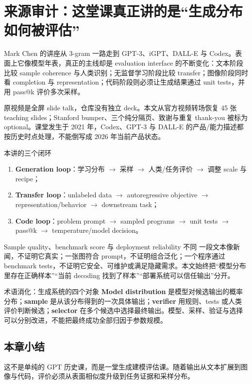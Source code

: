 \section{来源审计：这堂课真正讲的是“生成分布如何被评估”}

Mark Chen 的讲座从 3-gram 一路走到 GPT-3、iGPT、DALL-E 与 Codex。表面上它像模型年表，真正的主线却是 evaluation interface 的不断变化：文本阶段比较 sample coherence 与人类识别；无监督学习阶段比较 transfer；图像阶段同时看 completion 与 representation；代码阶段则必须让生成结果通过 unit tests，并用 pass@k 评价多次采样。

原视频是全屏 slide talk，仓库没有独立 deck。本文从官方视频转场恢复 45 张 teaching slides；Stanford bumper、三个纯分隔页、致谢与重复 thank-you 被标为 optional。课堂发生于 2021 年，Codex、GPT-3 与 DALL-E 的产品/能力描述都按历史时点处理，不能倒写成 2026 年当前产品状态。

\begin{importantbox}{本讲的三个闭环}
\begin{enumerate}
  \item \textbf{Generation loop}：学习分布 $\rightarrow$ 采样 $\rightarrow$ 人类/任务评价 $\rightarrow$ 调整 scale 与 recipe；
  \item \textbf{Transfer loop}：unlabeled data $\rightarrow$ autoregressive objective $\rightarrow$ representation/behavior $\rightarrow$ downstream task；
  \item \textbf{Code loop}：problem prompt $\rightarrow$ sampled programs $\rightarrow$ unit tests $\rightarrow$ pass@k $\rightarrow$ temperature/model decision。
\end{enumerate}
\end{importantbox}

\begin{warningbox}{Sample quality、benchmark score 与 deployment reliability 不同}
一段文本像新闻，不证明它真实；一张图符合 prompt，不证明组合泛化；一个程序通过 benchmark tests，不证明它安全、可维护或满足隐藏需求。本文始终把“模型分布里存在正确样本”“当前 decoding 找到了样本”“部署系统可以信任输出”分开。
\end{warningbox}

\begin{knowledgebox}{术语消化：生成系统的四个对象}
\textbf{Model distribution} 是模型对候选输出的概率分布；\textbf{sample} 是从该分布得到的一次具体输出；\textbf{verifier} 用规则、tests 或人类评价判断候选；\textbf{selector} 在多个候选中选择最终输出。模型、采样、验证与选择可以分别改进，不能把最终成功全部归因于参数规模。
\end{knowledgebox}

\subsection{本章小结}

这不是单纯的 GPT 历史课，而是一堂生成建模评估课。随着输出从文本扩展到图像与代码，评价必须从表面相似度升级到任务证据和采样分布。

